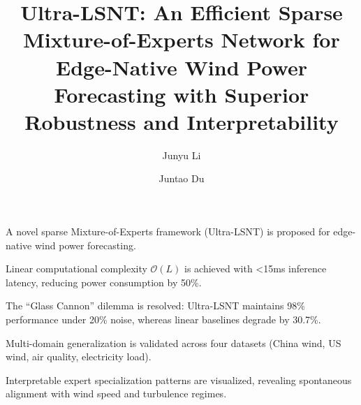 \documentclass[review,3p,times,draft]{elsarticle}
\begin{document}
\begin{frontmatter}

\title{Ultra-LSNT: An Efficient Sparse Mixture-of-Experts Network for Edge-Native Wind Power Forecasting with Superior Robustness and Interpretability}

\author[1]{Junyu Li}

\author[1]{Juntao Du}


\begin{highlights}
\item A novel sparse Mixture-of-Experts framework (Ultra-LSNT) is proposed for edge-native wind power forecasting.
\item Linear computational complexity $\mathcal{O}(L)$ is achieved with <15ms inference latency, reducing power consumption by 50\%.
\item The ``Glass Cannon'' dilemma is resolved: Ultra-LSNT maintains 98\% performance under 20\% noise, whereas linear baselines degrade by 30.7\%.
\item Multi-domain generalization is validated across four datasets (China wind, US wind, air quality, electricity load).
\item Interpretable expert specialization patterns are visualized, revealing spontaneous alignment with wind speed and turbulence regimes.
\end{highlights}


\end{frontmatter}
\end{document}
